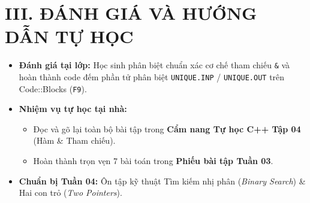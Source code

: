 \documentclass[11pt,a4paper]{article}
\begin{document}
\section*{\color{AsianDarkBlue}III. ĐÁNH GIÁ VÀ HƯỚNG DẪN TỰ HỌC}
\begin{itemize}
    \setlength{\itemsep}{1pt}
    \item \textbf{Đánh giá tại lớp:} Học sinh phân biệt chuẩn xác cơ chế tham chiếu \texttt{\&} và hoàn thành code đếm phần tử phân biệt \texttt{UNIQUE.INP} / \texttt{UNIQUE.OUT} trên Code::Blocks (\texttt{F9}).
    \item \textbf{Nhiệm vụ tự học tại nhà:}
    \begin{itemize}
        \item Đọc và gõ lại toàn bộ bài tập trong \textbf{Cẩm nang Tự học C++ Tập 04} (Hàm \& Tham chiếu).
        \item Hoàn thành trọn vẹn 7 bài toán trong \textbf{Phiếu bài tập Tuần 03}.
    \end{itemize}
    \item \textbf{Chuẩn bị Tuần 04:} Ôn tập kỹ thuật Tìm kiếm nhị phân (\textit{Binary Search}) \& Hai con trỏ (\textit{Two Pointers}).
\end{itemize}
\end{document}
